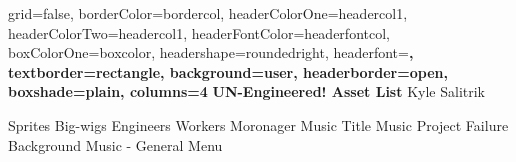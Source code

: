 \documentclass[archE1,portrait]{baposter}
\begin{document}
\begin{poster}
{
	grid=false,
	borderColor=bordercol, %
	headerColorOne=headercol1, %
	headerColorTwo=headercol1, %
	headerFontColor=headerfontcol, %
	boxColorOne=boxcolor, %
	headershape=roundedright, %
	headerfont=\Large\sf\bf, %
	textborder=rectangle,
	background=user,
	headerborder=open, %
	boxshade=plain,
	columns=4
}
{}
%
%
{
\sf\bf UN-Engineered! Asset List} %
{\vspace{.5em} Kyle Salitrik\\ %
} %
%


{ 
	\begin{outline}	
		\1 Sprites
			\2 Big-wigs
			\2 Engineers
			\2 Workers
			\2 Moronager
		\1 Music
			\2 Title Music
			\2 Project Failure
			\2 Background Music - General Menu
	\end{outline}
}

\end{poster}
\end{document}
